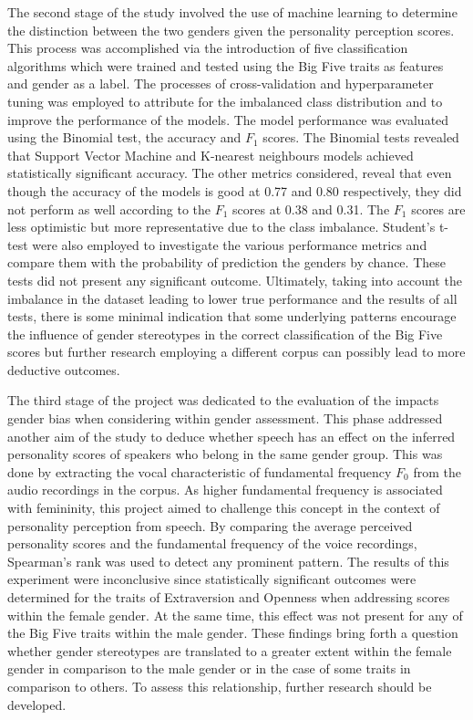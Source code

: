 \documentclass{l4proj}
\begin{document}
The second stage of the study involved the use of machine learning to determine the distinction between the two genders given the personality perception scores. This process was accomplished via the introduction of five classification algorithms which were trained and tested using the Big Five traits as features and gender as a label. The processes of cross-validation and hyperparameter tuning was employed to attribute for the imbalanced class distribution and to improve the performance of the models. The model performance was evaluated using the Binomial test, the accuracy and $F_1$ scores. The Binomial tests revealed that Support Vector Machine and K-nearest neighbours models achieved statistically significant accuracy. The other metrics considered, reveal that even though the accuracy of the models is good at 0.77 and 0.80 respectively, they did not perform as well according to the $F_1$ scores at 0.38 and 0.31. The $F_1$ scores are less optimistic but more representative due to the class imbalance. Student's t-test were also employed to investigate the various performance metrics and compare them with the probability of prediction the genders by chance. These tests did not present any significant outcome. Ultimately, taking into account the imbalance in the dataset leading to lower true performance and the results of all tests, there is some minimal indication that some underlying patterns encourage the influence of gender stereotypes in the correct classification of the Big Five scores but further research employing a different corpus can possibly lead to more deductive outcomes. 

The third stage of the project was dedicated to the evaluation of the impacts gender bias when considering within gender assessment. This phase addressed another aim of the study to deduce whether speech has an effect on the inferred personality scores of speakers who belong in the same gender group. This was done by extracting the vocal characteristic of fundamental frequency $F_0$ from the audio recordings in the corpus. As higher fundamental frequency is associated with femininity, this project aimed to challenge this concept in the context of personality perception from speech. By comparing the average perceived personality scores and the fundamental frequency of the voice recordings, Spearman’s rank was used to detect any prominent pattern. The results of this experiment were inconclusive since statistically significant outcomes were determined for the traits of Extraversion and Openness when addressing scores within the female gender. At the same time, this effect was not present for any of the Big Five traits within the male gender. These findings bring forth a question whether gender stereotypes are translated to a greater extent within the female gender in comparison to the male gender or in the case of some traits in comparison to others. To assess this relationship, further research should be developed.
\end{document}
